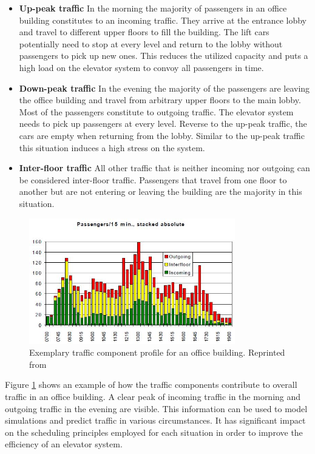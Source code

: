 \begin{itemize}
    \item \textbf{Up-peak traffic} In the morning the majority of passengers in an office building constitutes to an incoming traffic.
    They arrive at the entrance lobby and travel to different upper floors to fill the building.
    The lift cars potentially need to stop at every level and return to the lobby without passengers to pick up new ones. 
    This reduces the utilized capacity and puts a high load on the elevator system to convoy all passengers in time.
    \item \textbf{Down-peak traffic} In the evening the majority of the passengers are leaving the office building and travel from arbitrary upper floors to the main lobby.
    Most of the passengers constitute to outgoing traffic.
    The elevator system needs to pick up passengers at every level. 
    Reverse to the up-peak traffic, the cars are empty when returning from the lobby.
    Similar to the up-peak traffic this situation induces a high stress on the system.
    \item \textbf{Inter-floor traffic} All other traffic that is neither incoming nor outgoing can be considered inter-floor traffic. Passengers that travel from one floor to another but are not entering or leaving the building are the majority in this situation.
\end{itemize}

\begin{figure}[hbt]
	\centering
	\includegraphics[width=0.8\textwidth, keepaspectratio]{resources/traffictimes}
	\caption{\label{fig:sota:traffictimes} Exemplary traffic component profile for an office building.
	Reprinted from \textcite[][p.~14]{siikonen1997models}}
\end{figure}

Figure \ref{fig:sota:traffictimes} shows an example of how the traffic components contribute to overall traffic in an office building. A clear peak of incoming traffic in the morning and outgoing traffic in the evening are visible.
This information can be used to model simulations and predict traffic in various circumstances.
It has significant impact on the scheduling principles employed for each situation in order to improve the efficiency of an elevator system.


